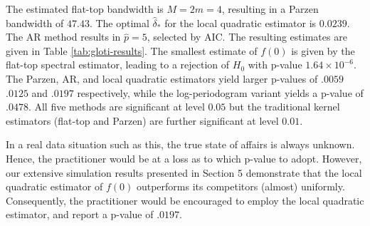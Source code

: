 \documentclass[12p E.Lt,psfig]{article} %
\begin{document}
\noindent
The estimated flat-top bandwidth is $M = 2m = 4$, resulting in a Parzen bandwidth of 
$ 47.43$. %
  The optimal $\widehat{\delta}_*$
 for the local quadratic estimator is $0.0239  $.  %
 The AR method results in $\widehat{p}=5$, selected by AIC.
 The resulting estimates    are given in Table \ref{tab:gloti-results}.
  The smallest estimate of $f(0)$ is given by the flat-top spectral estimator,  
   leading to a rejection of $H_0$ with p-value $1.64 \times 10^{-6}$.
  The Parzen,  AR, and local quadratic estimators yield larger
  p-values of $.0059 $  $.0125$   and   $.0197$ respectively, 
  while the log-periodogram variant %
yields a p-value of  $.0478 $.  
All five methods are   significant at level $0.05$ but the traditional 
kernel estimators (flat-top and Parzen)  are further  significant at level $0.01$.


In a  real data situation such as this,  the true state of   affairs is always unknown. 
  Hence, the practitioner would be at a loss as to which p-value to adopt. 
However, our extensive simulation results presented in Section 5 
demonstrate that the local quadratic estimator of $f(0)$ outperforms 
its competitors (almost) uniformly. Consequently, the practitioner would be
encouraged to employ the local quadratic estimator, and 
report a %
  p-value of $.0197$.


 



 
 
\end{document}
